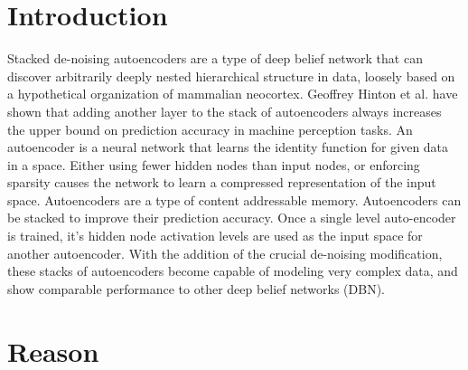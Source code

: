 \documentclass[11pt]{article}
\begin{document}
         
\section{Introduction}
\label{Introduction}

Stacked de-noising autoencoders are a type of deep belief network that can discover arbitrarily deeply nested hierarchical structure in data, loosely based on a hypothetical organization of mammalian neocortex. Geoffrey Hinton et al. have shown that adding another layer to the stack of autoencoders always increases the upper bound on prediction accuracy in machine perception tasks. An autoencoder is a neural network that learns the identity function for given data in a space. Either using fewer hidden nodes than input nodes, or enforcing sparsity causes the network to learn a compressed representation of the input space. Autoencoders are a type of content addressable memory. Autoencoders can be stacked to improve their prediction accuracy. Once a single level auto-encoder is trained, it's hidden node activation levels are used as the input space for another autoencoder. With the addition of the crucial de-noising modification, these stacks of autoencoders become capable of modeling very complex data, and show comparable performance to other deep belief networks (DBN).

\section{Reason}
\label{Reason}
\end{document}
